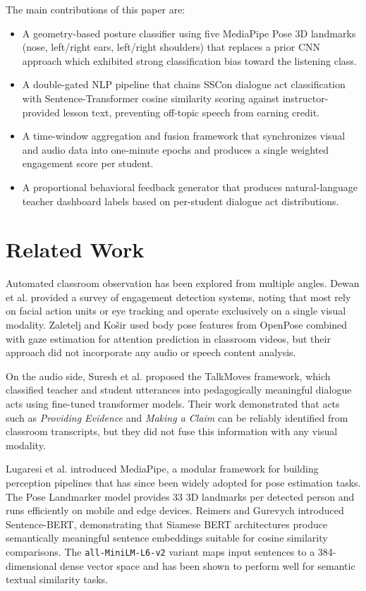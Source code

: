 \documentclass[conference]{IEEEtran}
\begin{document}
The main contributions of this paper are:
\begin{itemize}
    \item A geometry-based posture classifier using five MediaPipe Pose 3D landmarks (nose, left/right ears, left/right shoulders) that replaces a prior CNN approach which exhibited strong classification bias toward the listening class.
    \item A double-gated NLP pipeline that chains SSCon dialogue act classification with Sentence-Transformer cosine similarity scoring against instructor-provided lesson text, preventing off-topic speech from earning credit.
    \item A time-window aggregation and fusion framework that synchronizes visual and audio data into one-minute epochs and produces a single weighted engagement score per student.
    \item A proportional behavioral feedback generator that produces natural-language teacher dashboard labels based on per-student dialogue act distributions.
\end{itemize}
\section{Related Work}
Automated classroom observation has been explored from multiple angles. Dewan et al. \cite{b7} provided a survey of engagement detection systems, noting that most rely on facial action units or eye tracking and operate exclusively on a single visual modality. Zaletelj and Ko\v{s}ir \cite{b8} used body pose features from OpenPose combined with gaze estimation for attention prediction in classroom videos, but their approach did not incorporate any audio or speech content analysis.

On the audio side, Suresh et al. \cite{b4} proposed the TalkMoves framework, which classified teacher and student utterances into pedagogically meaningful dialogue acts using fine-tuned transformer models. Their work demonstrated that acts such as \emph{Providing Evidence} and \emph{Making a Claim} can be reliably identified from classroom transcripts, but they did not fuse this information with any visual modality.

Lugaresi et al. \cite{b2} introduced MediaPipe, a modular framework for building perception pipelines that has since been widely adopted for pose estimation tasks. The Pose Landmarker model provides 33 3D landmarks per detected person and runs efficiently on mobile and edge devices. Reimers and Gurevych \cite{b3} introduced Sentence-BERT, demonstrating that Siamese BERT architectures produce semantically meaningful sentence embeddings suitable for cosine similarity comparisons. The \texttt{all-MiniLM-L6-v2} variant maps input sentences to a 384-dimensional dense vector space and has been shown to perform well for semantic textual similarity tasks.
\end{document}
